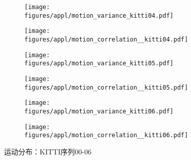 \begin{figure}[h]
\begin{subfigure}[b]{0.48\textwidth}
            \texttt{[image: figures/appl/motion\_variance\_kitti04.pdf]}
        \end{subfigure}
        \begin{subfigure}[b]{0.48\textwidth}
            \texttt{[image: figures/appl/motion\_correlation\_\_kitti04.pdf]}
        \end{subfigure}
        \begin{subfigure}[b]{0.48\textwidth}
            \texttt{[image: figures/appl/motion\_variance\_kitti05.pdf]}
        \end{subfigure}
        \begin{subfigure}[b]{0.48\textwidth}
            \texttt{[image: figures/appl/motion\_correlation\_\_kitti05.pdf]}
        \end{subfigure}
        \begin{subfigure}[b]{0.48\textwidth}
            \texttt{[image: figures/appl/motion\_variance\_kitti06.pdf]}
        \end{subfigure}
        \begin{subfigure}[b]{0.48\textwidth}
            \texttt{[image: figures/appl/motion\_correlation\_\_kitti06.pdf]}
        \end{subfigure}
        \caption{运动分布：KITTI序列00-06}
        \label{fig:mp_00_06}
    \end{figure} 

